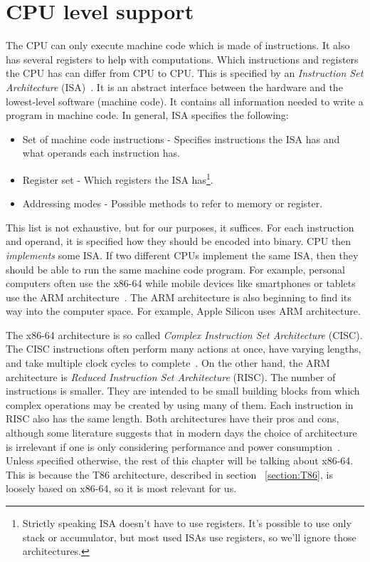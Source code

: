 \section{CPU level support}\label{section:cpu-debug-support}
The CPU can only execute machine code which is made of instructions. It also
has several registers to help with computations. Which instructions and
registers the CPU has can differ from CPU to CPU. This is specified by an
\textit{Instruction Set Architecture} (ISA)~\cite{isa}. It is an abstract
interface between the hardware and the lowest-level software (machine code). It
contains all information needed to write a program in machine code. In general,
ISA specifies the following: 
\begin{itemize}
    \item Set of machine code instructions - Specifies instructions the ISA has
        and what operands each instruction has.
    \item Register set - Which registers the ISA has\footnote{Strictly speaking
        ISA doesn't have to use registers. It's possible to use only stack or
        accumulator, but most used ISAs use registers, so we'll ignore those
        architectures. }.   
    \item Addressing modes - Possible methods to refer to memory or register. 
\end{itemize}
This list is not exhaustive, but for our purposes, it suffices. For each
instruction and operand, it is specified how they should be encoded into
binary. CPU then \textit{implements} some ISA. If two different CPUs implement
the same ISA, then they should be able to run the same machine code program.
For example, personal computers often use the x86-64 while mobile devices like
smartphones or tablets use the ARM architecture~\cite{riscvscisc2}. The ARM
architecture is also beginning to find its way into the computer space. For
example, Apple Silicon uses ARM architecture.

The x86-64 architecture is so called \textit{Complex Instruction Set
Architecture} (CISC). The CISC instructions often perform many actions at once,
have varying lengths, and take multiple clock cycles to
complete~\cite{intel-manual}. On the other hand, the ARM architecture is
\textit{Reduced Instruction Set Architecture} (RISC). The number of
instructions is smaller. They are intended to be small building blocks from
which complex operations may be created by using many of them. Each instruction
in RISC also has the same length. Both architectures have their pros and cons,
although some literature suggests that in modern days the choice of
architecture is irrelevant if one is only considering performance and power
consumption~\cite{riscvscisc1, riscvscisc2}. Unless specified otherwise, the
rest of this chapter will be talking about x86-64. This is because the T86
architecture, described in section ~\ref{section:T86}, is loosely based on
x86-64, so it is most relevant for us.

